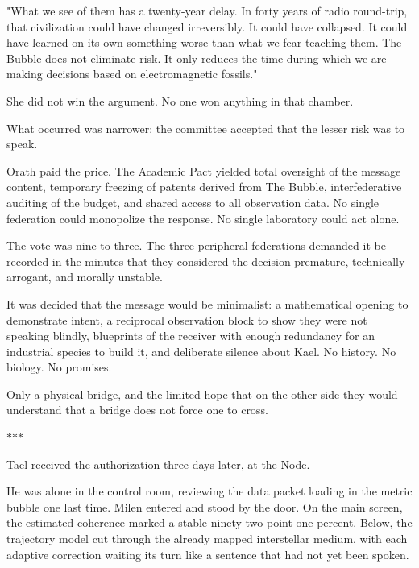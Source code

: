 \documentclass[11pt,a5paper,twoside]{book}
\begin{document}
"What we see of them has a twenty-year delay. In forty years of radio round-trip, that civilization could have changed irreversibly. It could have collapsed. It could have learned on its own something worse than what we fear teaching them. The Bubble does not eliminate risk. It only reduces the time during which we are making decisions based on electromagnetic fossils."

She did not win the argument. No one won anything in that chamber.

What occurred was narrower: the committee accepted that the lesser risk was to speak.

Orath paid the price. The Academic Pact yielded total oversight of the message content, temporary freezing of patents derived from The Bubble, interfederative auditing of the budget, and shared access to all observation data. No single federation could monopolize the response. No single laboratory could act alone.

The vote was nine to three. The three peripheral federations demanded it be recorded in the minutes that they considered the decision premature, technically arrogant, and morally unstable.

It was decided that the message would be minimalist: a mathematical opening to demonstrate intent, a reciprocal observation block to show they were not speaking blindly, blueprints of the receiver with enough redundancy for an industrial species to build it, and deliberate silence about Kael. No history. No biology. No promises.

Only a physical bridge, and the limited hope that on the other side they would understand that a bridge does not force one to cross.

\vspace{1.5em}
\begin{center}$\ast$\quad$\ast$\quad$\ast$\end{center}
\vspace{1.5em}

Tael received the authorization three days later, at the Node.

He was alone in the control room, reviewing the data packet loading in the metric bubble one last time. Milen entered and stood by the door. On the main screen, the estimated coherence marked a stable ninety-two point one percent. Below, the trajectory model cut through the already mapped interstellar medium, with each adaptive correction waiting its turn like a sentence that had not yet been spoken.
\end{document}
